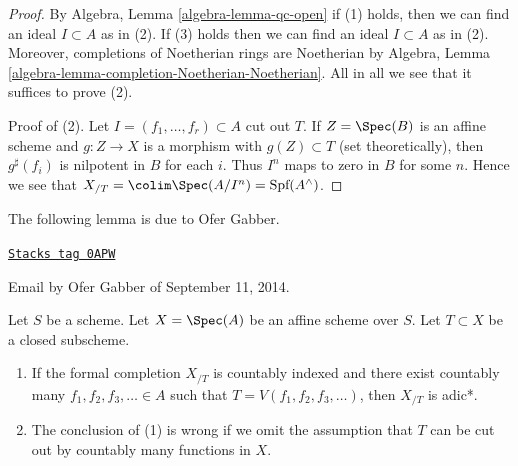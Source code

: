 \begin{proof}
By Algebra, Lemma \ref{algebra-lemma-qc-open} if (1) holds, then
we can find an ideal $I \subset A$ as in (2). If (3) holds then
we can find an ideal $I \subset A$ as in (2). Moreover, completions
of Noetherian rings are Noetherian by
Algebra, Lemma \ref{algebra-lemma-completion-Noetherian-Noetherian}.
All in all we see that it suffices to prove (2).

\medskip\noindent
Proof of (2).
Let $I = (f_1, \ldots, f_r) \subset A$ cut out $T$.
If $Z = \Spec(B)$ is an affine scheme and $g : Z \to X$ is
a morphism with $g(Z) \subset T$ (set theoretically), then
$g^\sharp(f_i)$ is nilpotent in $B$ for each $i$. Thus
$I^n$ maps to zero in $B$ for some $n$. Hence we see that
$X_{/T} = \colim \Spec(A/I^n) = \text{Spf}(A^\wedge)$.
\end{proof}

The following lemma is due to Ofer Gabber.

\begin{lemma}
\label{formal-spaces-lemma-completion-countably-indexed}
\href{https://stacks.math.columbia.edu/tag/0APW}{\texttt{Stacks tag 0APW}}

\begin{reference}
Email by Ofer Gabber of September 11, 2014.
\end{reference}
Let $S$ be a scheme. Let $X = \Spec(A)$ be an affine scheme over $S$.
Let $T \subset X$ be a closed subscheme.
\begin{enumerate}
\item If the formal completion $X_{/T}$ is countably indexed
and there exist countably many $f_1, f_2, f_3, \ldots \in A$ such that
$T = V(f_1, f_2, f_3, \ldots)$, then $X_{/T}$ is adic*.
\item The conclusion of (1) is wrong if we omit the assumption that
$T$ can be cut out by countably many functions in $X$.
\end{enumerate}
\end{lemma}


